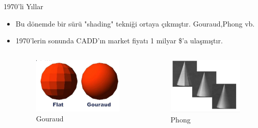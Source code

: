 \documentclass{beamer}
\begin{document}
\begin{frame}{1970'li Yıllar}
\begin{itemize}
\item Bu dönemde bir sürü "shading" tekniği ortaya çıkmıştır. Gouraud,Phong vb.
\item 1970'lerin sonunda CADD'ın market fiyatı 1 milyar \$'a ulaşmıştır. 
\begin{columns}
\begin{column}{0.4\textwidth}
\begin{figure}
\includegraphics[width=\textwidth]{Gouraud.PNG}
\caption{Gouraud}
\end{figure}
\end{column}
\begin{column}{0.4\textwidth}
\begin{figure}
\includegraphics[width=\textwidth]{Phong.PNG}
\caption{Phong}
\end{figure}
\end{column}
\end{columns}
\end{itemize}
\end{frame}
\end{document}
